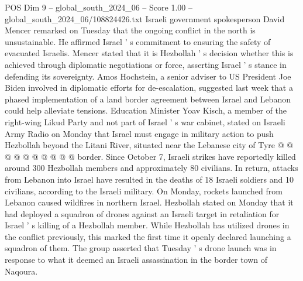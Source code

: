 \begin{textsample}{POS Dim 9 – global\_south\_2024\_06 – Score 1.00 – global\_south\_2024\_06/108824426.txt}
Israeli government spokesperson David Mencer remarked on Tuesday that the ongoing conflict in the north is unsustainable.
He affirmed Israel ' s commitment to ensuring the safety of evacuated Israelis.
Mencer stated that it is Hezbollah ' s decision whether this is achieved through diplomatic negotiations or force, asserting Israel ' s stance in defending its sovereignty.
Amos Hochstein, a senior adviser to US President Joe Biden involved in diplomatic efforts for de-escalation, suggested last week that a phased implementation of a land border agreement between Israel and Lebanon could help alleviate tensions.
Education Minister Yoav Kisch, a member of the right-wing Likud Party and not part of Israel ' s war cabinet, stated on Israeli Army Radio on Monday that Israel must engage in military action to push Hezbollah beyond the Litani River, situated near the Lebanese city of Tyre @ @ @ @ @ @ @ @ @ @ border.
Since October 7, Israeli strikes have reportedly killed around 300 Hezbollah members and approximately 80 civilians.
In return, attacks from Lebanon into Israel have resulted in the deaths of 18 Israeli soldiers and 10 civilians, according to the Israeli military.
On Monday, rockets launched from Lebanon caused wildfires in northern Israel.
Hezbollah stated on Monday that it had deployed a squadron of drones against an Israeli target in retaliation for Israel ' s killing of a Hezbollah member.
While Hezbollah has utilized drones in the conflict previously, this marked the first time it openly declared launching a squadron of them.
The group asserted that Tuesday ' s drone launch was in response to what it deemed an Israeli assassination in the border town of Naqoura.

\end{textsample}
